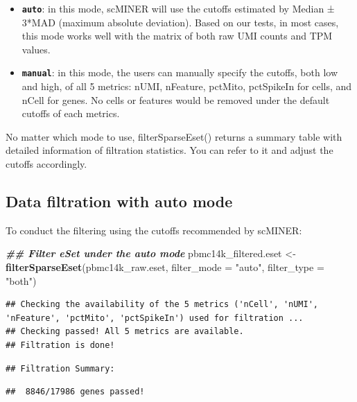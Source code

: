 \documentclass[
  12pt,
]{book}
\newenvironment{Shaded}{\begin{snugshade}}{\end{snugshade}}
\newcommand{\AttributeTok}[1]{\textcolor[rgb]{0.13,0.29,0.53}{#1}}
\newcommand{\DocumentationTok}[1]{\textcolor[rgb]{0.56,0.35,0.01}{\textbf{\textit{#1}}}}
\newcommand{\FunctionTok}[1]{\textcolor[rgb]{0.13,0.29,0.53}{\textbf{#1}}}
\newcommand{\NormalTok}[1]{#1}
\newcommand{\OtherTok}[1]{\textcolor[rgb]{0.56,0.35,0.01}{#1}}
\newcommand{\StringTok}[1]{\textcolor[rgb]{0.31,0.60,0.02}{#1}}
\providecommand{\tightlist}{%
  \setlength{\itemsep}{0pt}\setlength{\parskip}{0pt}}
\begin{document}
\begin{itemize}
\tightlist
\item
  \textbf{\texttt{auto}}: in this mode, scMINER will use the cutoffs estimated by Median ± 3*MAD (maximum absolute deviation). Based on our tests, in most cases, this mode works well with the matrix of both raw UMI counts and TPM values.
\item
  \textbf{\texttt{manual}}: in this mode, the users can manually specify the cutoffs, both low and high, of all 5 metrics: nUMI, nFeature, pctMito, pctSpikeIn for cells, and nCell for genes. No cells or features would be removed under the default cutoffs of each metrics.
\end{itemize}

No matter which mode to use, filterSparseEset() returns a summary table with detailed information of filtration statistics. You can refer to it and adjust the cutoffs accordingly.

\subsection{Data filtration with auto mode}\label{data-filtration-with-auto-mode}

To conduct the filtering using the cutoffs recommended by scMINER:

\begin{Shaded}
\begin{Highlighting}[]
\DocumentationTok{\#\# Filter eSet under the auto mode}
\NormalTok{pbmc14k\_filtered.eset }\OtherTok{\textless{}{-}} \FunctionTok{filterSparseEset}\NormalTok{(pbmc14k\_raw.eset, }\AttributeTok{filter\_mode =} \StringTok{"auto"}\NormalTok{, }\AttributeTok{filter\_type =} \StringTok{"both"}\NormalTok{)}
\end{Highlighting}
\end{Shaded}

\begin{verbatim}
## Checking the availability of the 5 metrics ('nCell', 'nUMI', 'nFeature', 'pctMito', 'pctSpikeIn') used for filtration ...
## Checking passed! All 5 metrics are available.
## Filtration is done!
\end{verbatim}

\begin{verbatim}
## Filtration Summary:
\end{verbatim}

\begin{verbatim}
##  8846/17986 genes passed!
\end{verbatim}
\end{document}
